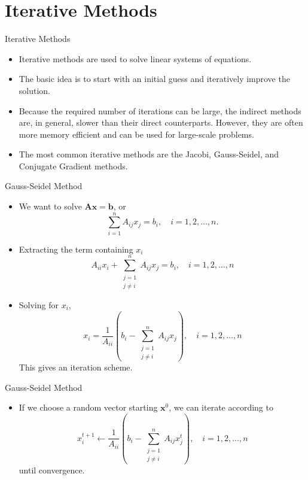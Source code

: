 \documentclass{beamer}
\begin{document}
\section{Iterative Methods}
\begin{frame}{Iterative Methods}
    \begin{itemize}
        \item Iterative methods are used to solve linear systems of equations.
        \item The basic idea is to start with an initial guess and iteratively improve the solution.
        \item  Because the required number of iterations can be large, the indirect methods are, in general,
        slower than their direct counterparts. However, they are often more memory efficient and can be used for large-scale problems.
        \item The most common iterative methods are the Jacobi, Gauss-Seidel, and Conjugate Gradient methods.
    \end{itemize}
    
\end{frame}
\begin{frame}{Gauss-Seidel Method}
    \begin{itemize}
    \item We want to solve $\mathbf{Ax}=\mathbf{b}$, or
    $$
    \sum_{i=1}^n A_{i j} x_j=b_i, \quad i=1,2, \ldots, n.
    $$
    \item Extracting the term containing $x_i$
    $$
    A_{i i} x_i+\sum_{\substack{j=1 \\ j \neq i}}^n A_{i j} x_j=b_i, \quad i=1,2, \ldots, n
    $$
    \item Solving for $x_i$, 
    $$
x_i=\frac{1}{A_{i i}}\left(b_i-\sum_{\substack{j=1 \\ j \neq i}}^n A_{i j} x_j\right), \quad i=1,2, \ldots, n
$$
This gives an iteration scheme.
    \end{itemize}
\end{frame}
\begin{frame}{Gauss-Seidel Method}
    \begin{itemize}
        \item If we choose a random vector starting $\mathbf{x}^0$, we can iterate according to  
        $$
x_i^{t+1} \leftarrow \frac{1}{A_{i i}}\left(b_i-\sum_{\substack{j=1 \\ j \neq i}}^n A_{i j} x_j^{t}\right), \quad i=1,2, \ldots, n
$$
until convergence.
    \end{itemize}
\end{frame}
\end{document}
